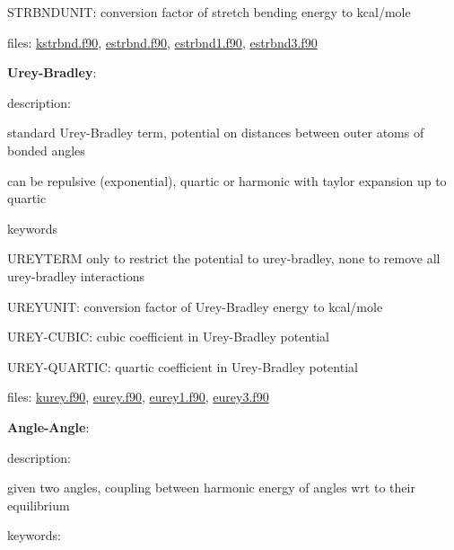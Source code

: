 \begin{DoxyItemize}
\begin{DoxyItemize}
\begin{DoxyItemize}
\item S\-T\-R\-B\-N\-D\-U\-N\-I\-T\-: conversion factor of stretch bending energy to kcal/mole
\end{DoxyItemize}
\item files\-: \hyperlink{kstrbnd_8f90}{kstrbnd.\-f90}, \hyperlink{estrbnd_8f90}{estrbnd.\-f90}, \hyperlink{estrbnd1_8f90}{estrbnd1.\-f90}, \hyperlink{estrbnd3_8f90}{estrbnd3.\-f90}
\end{DoxyItemize}
\item {\bfseries Urey-\/\-Bradley}\-:
\begin{DoxyItemize}
\item description\-:
\begin{DoxyItemize}
\item standard Urey-\/\-Bradley term, potential on distances between outer atoms of bonded angles
\item can be repulsive (exponential), quartic or harmonic with taylor expansion up to quartic
\end{DoxyItemize}
\item keywords
\begin{DoxyItemize}
\item U\-R\-E\-Y\-T\-E\-R\-M only to restrict the potential to urey-\/bradley, none to remove all urey-\/bradley interactions
\item U\-R\-E\-Y\-U\-N\-I\-T\-: conversion factor of Urey-\/\-Bradley energy to kcal/mole
\item U\-R\-E\-Y-\/\-C\-U\-B\-I\-C\-: cubic coefficient in Urey-\/\-Bradley potential
\item U\-R\-E\-Y-\/\-Q\-U\-A\-R\-T\-I\-C\-: quartic coefficient in Urey-\/\-Bradley potential
\end{DoxyItemize}
\item files\-: \hyperlink{kurey_8f90}{kurey.\-f90}, \hyperlink{eurey_8f90}{eurey.\-f90}, \hyperlink{eurey1_8f90}{eurey1.\-f90}, \hyperlink{eurey3_8f90}{eurey3.\-f90}
\end{DoxyItemize}
\item {\bfseries Angle-\/\-Angle}\-:
\begin{DoxyItemize}
\item description\-:
\begin{DoxyItemize}
\item given two angles, coupling between harmonic energy of angles wrt to their equilibrium
\end{DoxyItemize}
\item keywords\-:
\begin{DoxyItemize}

\end{DoxyItemize}
\end{DoxyItemize}
\end{DoxyItemize}
